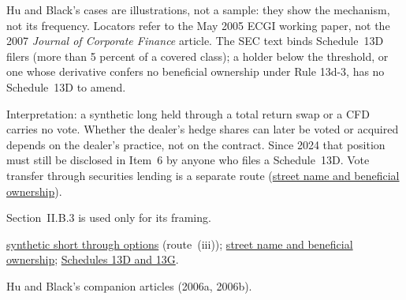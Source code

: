 \begin{qfevidence}
 Hu and Black's cases are illustrations, not a sample: they show the mechanism, not its frequency. Locators refer to the May 2005 ECGI working paper, not the 2007 \emph{Journal of Corporate Finance} article. The SEC text binds Schedule~13D filers (more than 5 percent of a covered class); a holder below the threshold, or one whose derivative confers no beneficial ownership under Rule 13d-3, has no Schedule~13D to amend.

 Interpretation: a synthetic long held through a total return swap or a CFD carries no vote. Whether the dealer's hedge shares can later be voted or acquired depends on the dealer's practice, not on the contract. Since 2024 that position must still be disclosed in Item~6 by anyone who files a Schedule~13D. Vote transfer through securities lending is a separate route (\hyperref[def:street-name-beneficial-ownership]{street name and beneficial ownership}).

 Section~II.B.3 is used only for its framing.

 \hyperref[res:synthetic-short-put-call]{synthetic short through options} (route~(iii)); \hyperref[def:street-name-beneficial-ownership]{street name and beneficial ownership}; \hyperref[data:holdings-insider-filing-lags]{Schedules 13D and 13G}.

 Hu and Black's companion articles (2006a, 2006b).

\end{qfevidence}
